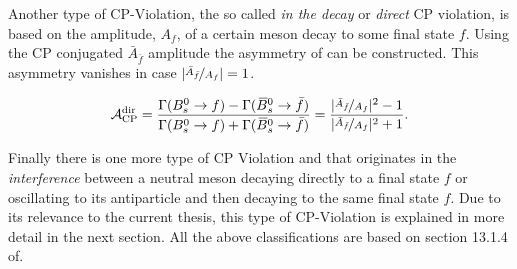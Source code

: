 Another type of CP-Violation, the so called {\it in the decay} or {\it direct} CP violation, is based on the
amplitude, $A_f$, of a certain meson decay to some final state $f$.
Using the CP conjugated $\bar{A}_{\bar{f}}$ amplitude the asymmetry of  can be constructed.
This asymmetry vanishes in case $|\nicefrac{\bar{A}_{\bar{f}}}{A_f}| = 1$.

\begin{equation}
  \centering
  \Acp{\text{dir}} = \frac{\Gamma(\Bs \rightarrow f) - \Gamma(\Bsb \rightarrow \bar{f})} {\Gamma(\Bs \rightarrow f) + \Gamma(\Bsb \rightarrow \bar{f})}
                   = \frac{ |\nicefrac{\bar{A}_{\bar{f}}}{A_f}|^2 - 1}{|\nicefrac{\bar{A}_{\bar{f}}}{A_f}|^2 + 1}.
\label{cpv_decay}
\end{equation}

Finally there is one more type of CP Violation and that originates in the {\it interference} between
a neutral meson decaying directly to a final state $f$ or oscillating to its antiparticle and then decaying
to the same final state $f$. Due to its relevance to the current thesis, this type of CP-Violation is explained
in more detail in the next section. All the above classifications are based on section 13.1.4 of\cite{PDG}.
